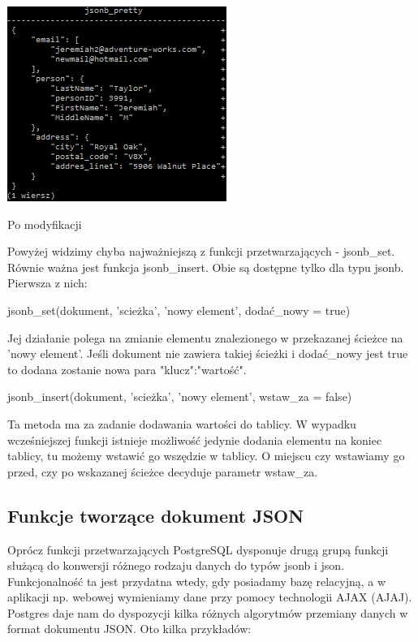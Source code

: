 \documentclass[a4paper,12pt,table]{article}
\begin{document}
{\begin{minipage}{0.5\textwidth}
\end{minipage}
\begin{minipage}{0.5\textwidth}
\makeatletter
\def\@captype{figure}
\makeatother
\begin{center}
\includegraphics[scale=1]{sc/37}
\caption{Po modyfikacji}
\end{center}
\end{minipage}
\vspace{0.5cm}\newline
Powyżej widzimy chyba najważniejszą z funkcji przetwarzających - jsonb\_set. Równie ważna jest funkcja jsonb\_insert. Obie są dostępne tylko dla typu jsonb. Pierwsza z nich:
\begin{center}
jsonb\_set(dokument, '{scieżka}', 'nowy element', dodać\_nowy = true) 
\end{center}
Jej działanie polega na zmianie elementu znalezionego w przekazanej ścieżce na 'nowy element'. Jeśli dokument nie zawiera takiej ścieżki i dodać\_nowy jest true to dodana zostanie nowa para "klucz":"wartość".

\begin{center}
jsonb\_insert(dokument, '{scieżka}', 'nowy element', wstaw\_za = false) 
\end{center}
Ta metoda ma za zadanie dodawania wartości do tablicy.
W wypadku wcześniejszej funkcji istnieje możliwość jedynie dodania elementu na koniec tablicy, tu możemy wstawić go wszędzie w tablicy. O miejscu czy wstawiamy go przed, czy po wskazanej ścieżce decyduje parametr wstaw\_za.
\newpage
\subsection{Funkcje tworzące dokument JSON}
Oprócz funkcji przetwarzających PostgreSQL dysponuje drugą grupą funkcji służącą do konwersji różnego rodzaju danych do typów jsonb i json. Funkcjonalność ta jest przydatna wtedy, gdy posiadamy bazę relacyjną, a w aplikacji np. webowej wymieniamy dane przy pomocy technologii AJAX (AJAJ). Postgres daje nam do dyspozycji kilka różnych algorytmów przemiany danych w format dokumentu JSON. Oto kilka przykładów: 
}
\end{document}
